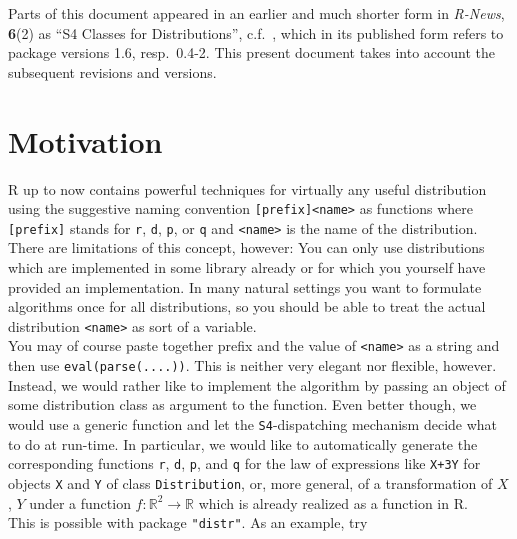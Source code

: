 \documentclass[11pt]{article}
\newcommand{\code}[1]{{\tt #1}}
\newcommand{\pkg}[1]{{\tt "#1"}}
\newcommand{\Reals}{\mathbb{R}}
\begin{document}
\tableofcontents
\noindent
{\small Parts of this document appeared in an earlier and much shorter form in 
{\em R-News\/}, {\bf 6}(2) as {\sf ``S4 Classes for Distributions''}, 
c.f.\ \cite{R:K:S:C:04}, which in its 
published form refers to package versions 1.6, resp.\ 0.4-2. This present document 
takes into account the subsequent revisions and versions.}\medskip
\addtocounter{section}{-1}
\section{Motivation}
{\sf R} up to now contains powerful techniques for virtually
any useful distribution using the suggestive naming convention
{\tt [prefix]<name>} as functions where {\tt [prefix]} stands for
 {\tt r}, {\tt d}, {\tt p}, or {\tt q}
 and {\tt <name>} is the name of the distribution.\\
There are limitations of this concept, however:
You can only use distributions which are implemented in some library
already or for which you yourself have provided an implementation.
In many natural settings you want to formulate algorithms once for
all distributions, so you should be able to treat the actual distribution 
{\tt <name>} as sort of a variable.\\
You may of course paste together prefix and the value of {\tt <name>} as a 
string and then use \code{eval(parse(....))}. This is neither very elegant nor 
flexible, however.\\
%
Instead, we would rather like to implement the algorithm by passing an object of 
some distribution class as argument to the function. Even better though, we 
would use a generic function and let the {\tt S4}-dispatching mechanism decide 
what to do at run-time. In particular, we would like to automatically generate 
the corresponding functions {\tt r}, {\tt d}, {\tt p}, and {\tt q} for the law 
of expressions like \code{X+3Y} for objects \code{X} and \code{Y} of class 
\code{Distribution}, or, more general, of a transformation of $X$, $Y$ under a 
function $f\colon \Reals^2 \to \Reals$ which is already realized as a function 
in {\sf R}.\\
This is possible with package \pkg{distr}. As an example, try
\end{document}

